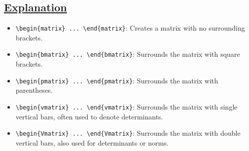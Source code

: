 \documentclass{article}
\begin{document}
\begin{center}
\section*{\textbf{\underline{\LARGE{Explanation}}}}
\end{center}
\begin{itemize}
  \item \texttt{\textbackslash begin\{matrix\} ... \textbackslash end\{matrix\}}: Creates a matrix with no surrounding brackets.
  \item \texttt{\textbackslash begin\{bmatrix\} ... \textbackslash end\{bmatrix\}}: Surrounds the matrix with square brackets.
  \item \texttt{\textbackslash begin\{pmatrix\} ... \textbackslash end\{pmatrix\}}: Surrounds the matrix with parentheses.
  \item \texttt{\textbackslash begin\{vmatrix\} ... \textbackslash end\{vmatrix\}}: Surrounds the matrix with single vertical bars, often used to denote determinants.
  \item \texttt{\textbackslash begin\{Vmatrix\} ... \textbackslash end\{Vmatrix\}}: Surrounds the matrix with double vertical bars, also used for determinants or norms.
\end{itemize}
\end{document}
